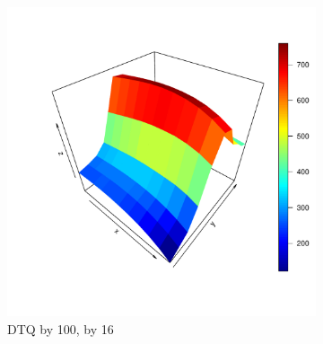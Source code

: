 \documentclass[a4paper,11pt]{article}
\begin{document}
\begin{figure}[H]
\medskip


\begin{subfigure}{0.48\textwidth}
\includegraphics[width=\linewidth]{dtq_by100_by16.pdf}
\caption{DTQ by 100, by 16} \label{fig:e}
\end{subfigure}\hspace*{\fill}
\begin{subfigure}{0.48\textwidth}

\end{subfigure}
\end{figure}
\end{document}
